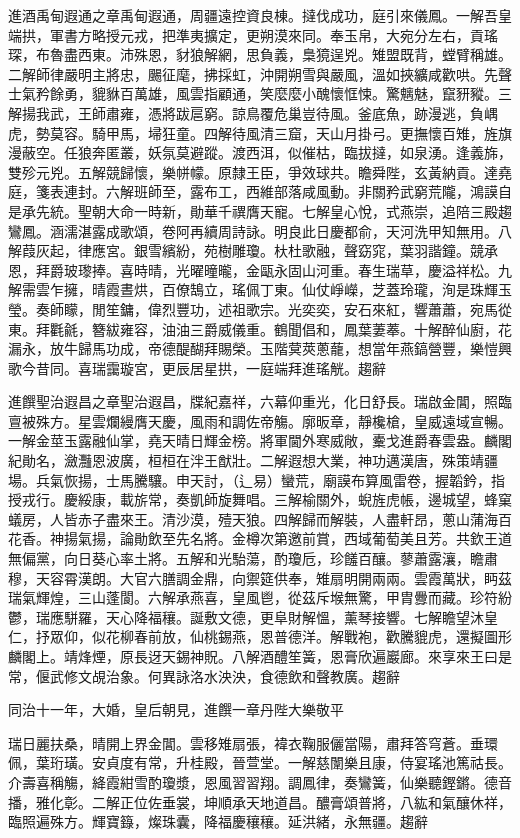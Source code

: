 \begin{pinyinscope}
進酒禹甸遐通之章禹甸遐通，周疆遠控資良棟。撻伐成功，庭引來儀鳳。一解吾皇端拱，軍書方略授元戎，把準夷擴定，更朔漠來同。奉玉帛，大宛分左右，貢瑤琛，布魯盡西東。沛殊恩，豺狼解網，思負義，梟獍逞兇。雉盟既背，螳臂稱雄。二解師律嚴明主將忠，颺征麾，拂採虹，沖開朔雪與嚴風，溫如挾纊咸歡哄。先聲士氣矜餘勇，貔貅百萬雄，風雲指顧通，笑麼麼小醜懷恇悚。驚魑魅，竄豜豵。三解揚我武，王師肅雍，憑將跋扈窮。諒鳥覆危巢豈待風。釜底魚，跡漫逃，負嵎虎，勢莫容。騎甲馬，埽狂童。四解待風清三窟，天山月掛弓。更撫懷百雉，旌旗漫蔽空。任狼奔匿叢，妖氛莫避蹤。渡西洱，似催枯，臨拔撻，如泉湧。逢義旆，雙殄元兇。五解競歸懷，樂帡幪。原隸王臣，爭效球共。瞻舜陛，玄黃納貢。達堯庭，箋表連封。六解班師至，露布工，西維部落咸風動。非關矜武窮荒隴，鴻謨自是承先統。聖朝大命一時新，勛華千禩膺天寵。七解皇心悅，式燕崇，追陪三殿趨鸞鳳。涵濡湛露成歌頌，卷阿再續周詩詠。明良此日慶都俞，天河洗甲知無用。八解葭灰起，律應宮。銀雪繽紛，苑樹雕瓊。杕杜歌融，聲窈窕，葉羽諧鐘。競承恩，拜爵玻瓈捧。喜時晴，光曜曈曨，金甌永固山河重。春生瑞草，慶溢祥松。九解需雲乍擁，晴霞晝烘，百僚鵠立，瑤佩丁東。仙仗崢嶸，芝蓋玲瓏，洵是珠輝玉瑩。奏師矇，閒笙鏞，偉烈豐功，述祖歌宗。光奕奕，安石來紅，響蕭蕭，宛馬從東。拜氍毹，簪紱雍容，油油三爵威儀重。鶴聞倡和，鳳葉萋菶。十解醉仙廚，花漏永，放牛歸馬功成，帝德醍醐拜賜榮。玉階蓂莢蔥蘢，想當年燕鎬營豐，樂愷興歌今昔同。喜瑞靄璇宮，更辰居星拱，一庭端拜進瑤觥。趨辭

進饌聖治遐昌之章聖治遐昌，牒紀嘉祥，六幕仰重光，化日舒長。瑞啟金閶，照臨亶被殊方。星雲爛縵膺天慶，風雨和調佐帝觴。廓昄章，靜欃槍，皇威遠域宣暢。一解金莖玉露融仙掌，堯天晴日輝金榜。將軍閫外寒威敞，櫜戈進爵春雲盎。麟閣紀勛名，瀲灩恩波廣，桓桓在泮王猷壯。二解遐想大業，神功邁漢唐，殊策靖疆場。兵氣恢揚，士馬騰驤。申天討，（辶易）蠻荒，廟謨布算風雷卷，握韜鈐，指授戎行。慶綏康，載旂常，奏凱師旋舞唱。三解榆關外，蜺旌虎帳，邊城望，蜂窠蟻房，人皆赤子盡來王。清沙漠，殪天狼。四解歸而解裝，人盡軒昂，蔥山蒲海百花香。神揚氣揚，論勛飲至先名將。金樽次第邀前賞，西域葡萄美且芳。共欽王道無偏黨，向日葵心率土將。五解和光駘蕩，酌瓊卮，珍饈百釀。蓼蕭露瀼，瞻肅穆，天容霄漢朗。大官六膳調金鼎，向禦筵供奉，雉扇明開兩兩。雲霞萬狀，眄茲瑞氣輝煌，三山蓬閬。六解承燕喜，皇風鬯，從茲斥堠無驚，甲胄釁而藏。珍符紛鬱，瑞應駢羅，天心降福穰。誕敷文德，更阜財解慍，薰琴接響。七解瞻望沐皇仁，抒眾仰，似花柳春前放，仙桃錫燕，恩普德洋。解戰袍，歡騰貔虎，還擬圖形麟閣上。靖烽煙，原長迓天錫神貺。八解酒醴笙簧，恩膏欣遍巖廊。來享來王曰是常，偃武修文覘治象。何異詠洛水泱泱，食德飲和聲教廣。趨辭

同治十一年，大婚，皇后朝見，進饌一章丹陛大樂敬平

瑞日麗扶桑，晴開上界金閶。雲移雉扇張，褘衣鞠服儷當陽，肅拜答穹蒼。垂環佩，葉珩璜。安貞度有常，升桂殿，晉萱堂。一解慈闈樂且康，侍宴瑤池篤祜長。介壽喜稱觴，絳霞紺雪酌瓊漿，恩風習習翔。調鳳律，奏鸞簧，仙樂聽鏗鏘。德音播，雅化彰。二解正位佐垂裳，坤順承天地道昌。醲膏頌普將，八紘和氣釀休祥，臨照遍殊方。輝寶籙，燦珠囊，降福慶穰穰。延洪緒，永無疆。趨辭


\end{pinyinscope}
